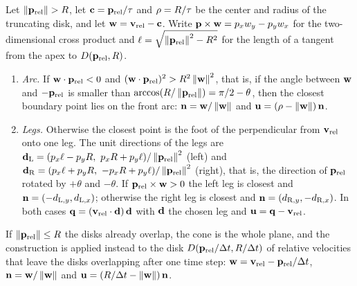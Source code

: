 \begin{lemma}
\label{thm:ch13-cases}
Let $\left\lVert \mathbf{p}_{\mathrm{rel}} \right\rVert > R$, let $\mathbf{c} = \mathbf{p}_{\mathrm{rel}}/\tau$
and $\rho = R/\tau$ be the center and radius of the truncating disk, and
let $\mathbf{w} = \mathbf{v}_{\mathrm{rel}} - \mathbf{c}$. Write
$\mathbf{p} \times \mathbf{w} = p_x w_y - p_y w_x$ for the two-dimensional cross
product and $\ell = \sqrt{\left\lVert \mathbf{p}_{\mathrm{rel}} \right\rVert^2 - R^2}$ for the length
of a tangent from the apex to $D(\mathbf{p}_{\mathrm{rel}},R)$.
\begin{enumerate}[label=(\roman*)]
  \item \emph{Arc.} If $\mathbf{w}\cdot\mathbf{p}_{\mathrm{rel}} < 0$ and
  $(\mathbf{w}\cdot\mathbf{p}_{\mathrm{rel}})^2 > R^2\left\lVert \mathbf{w} \right\rVert^2$, that is, if
  the angle between $\mathbf{w}$ and $-\mathbf{p}_{\mathrm{rel}}$ is smaller than
  $\arccos(R/\left\lVert \mathbf{p}_{\mathrm{rel}} \right\rVert) = \pi/2 - \theta$, then the closest
  boundary point lies on the front arc:
  $\mathbf{n} = \mathbf{w}/\left\lVert \mathbf{w} \right\rVert$ and
  $\mathbf{u} = (\rho - \left\lVert \mathbf{w} \right\rVert)\,\mathbf{n}$.
  \item \emph{Legs.} Otherwise the closest point is the foot of the
  perpendicular from $\mathbf{v}_{\mathrm{rel}}$ onto one leg. The unit directions
  of the legs are $\mathbf{d}_{\mathrm{L}} = (p_x\ell - p_y R,\ p_x R + p_y\ell)/\left\lVert \mathbf{p}_{\mathrm{rel}} \right\rVert^2$
  (left) and $\mathbf{d}_{\mathrm{R}} = (p_x\ell + p_y R,\ -p_x R + p_y\ell)/\left\lVert \mathbf{p}_{\mathrm{rel}} \right\rVert^2$
  (right), that is, the direction of $\mathbf{p}_{\mathrm{rel}}$ rotated by
  $+\theta$ and $-\theta$. If $\mathbf{p}_{\mathrm{rel}} \times \mathbf{w} > 0$ the
  left leg is closest and $\mathbf{n} = (-d_{\mathrm{L},y}, d_{\mathrm{L},x})$;
  otherwise the right leg is closest and
  $\mathbf{n} = (d_{\mathrm{R},y}, -d_{\mathrm{R},x})$. In both cases
  $\mathbf{q} = (\mathbf{v}_{\mathrm{rel}}\cdot\mathbf{d})\,\mathbf{d}$ with
  $\mathbf{d}$ the chosen leg and $\mathbf{u} = \mathbf{q} - \mathbf{v}_{\mathrm{rel}}$.
\end{enumerate}
If $\left\lVert \mathbf{p}_{\mathrm{rel}} \right\rVert \le R$ the disks already overlap, the cone is
the whole plane, and the construction is applied instead to the disk
$D(\mathbf{p}_{\mathrm{rel}}/\Delta t,R/\Delta t)$ of relative velocities that leave the
disks overlapping after one time step: $\mathbf{w} = \mathbf{v}_{\mathrm{rel}} -
\mathbf{p}_{\mathrm{rel}}/\Delta t$, $\mathbf{n} = \mathbf{w}/\left\lVert \mathbf{w} \right\rVert$ and
$\mathbf{u} = (R/\Delta t - \left\lVert \mathbf{w} \right\rVert)\,\mathbf{n}$.
\end{lemma}
